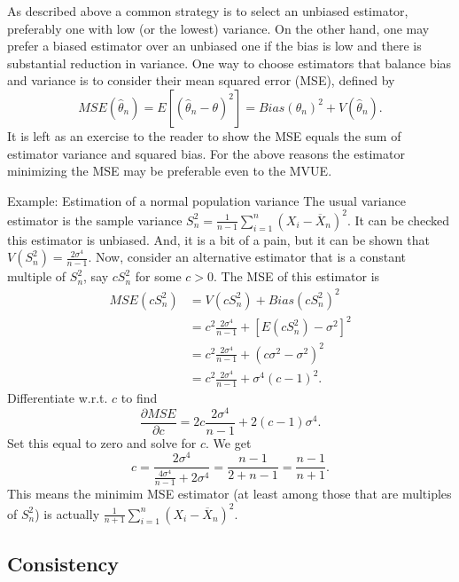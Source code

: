 \documentclass[
]{book}
\begin{document}
As described above a common strategy is to select an unbiased estimator, preferably one with low (or the lowest) variance. On the other hand, one may prefer a biased estimator over an unbiased one if the bias is low and there is substantial reduction in variance. One way to choose estimators that balance bias and variance is to consider their mean squared error (MSE), defined by
\[MSE(\hat\theta_n) = E[(\hat\theta_n - \theta)^2] = Bias(\theta_n)^2 + V(\hat\theta_n).\]
It is left as an exercise to the reader to show the MSE equals the sum of estimator variance and squared bias. For the above reasons the estimator minimizing the MSE may be preferable even to the MVUE.

Example: Estimation of a normal population variance
The usual variance estimator is the sample variance \(S^2_n = \frac{1}{n-1}\sum_{i=1}^n (X_i - \overline X_n)^2\). It can be checked this estimator is unbiased. And, it is a bit of a pain, but it can be shown that \(V(S_n^2) = \frac{2\sigma^4}{n-1}\). Now, consider an alternative estimator that is a constant multiple of \(S^2_n\), say \(c S_n^2\) for some \(c>0\). The MSE of this estimator is
\begin{align*}
MSE(cS_n^2) &= V(cS_n^2) + Bias(cS_n^2)^2\\
& = c^2\frac{2\sigma^4}{n-1} + [E(cS_n^2) - \sigma^2]^2\\
& = c^2\frac{2\sigma^4}{n-1} + (c\sigma^2 - \sigma^2)^2\\
& = c^2\frac{2\sigma^4}{n-1} + \sigma^4(c-1)^2.
\end{align*}
Differentiate w.r.t. \(c\) to find
\[\frac{\partial MSE}{\partial c} = 2c \frac{2\sigma^4}{n-1} + 2(c-1)\sigma^4.\]
Set this equal to zero and solve for \(c\). We get
\[c = \frac{2\sigma^4}{\frac{4\sigma^4}{n-1} + 2\sigma^4} = \frac{n-1}{2+n-1} = \frac{n-1}{n+1}.\]
This means the minimim MSE estimator (at least among those that are multiples of \(S_n^2\)) is actually \(\frac{1}{n+1}\sum_{i=1}^n (X_i - \overline X_n)^2\).

\hypertarget{consistency}{%
\subsection{Consistency}\label{consistency}}
\end{document}
